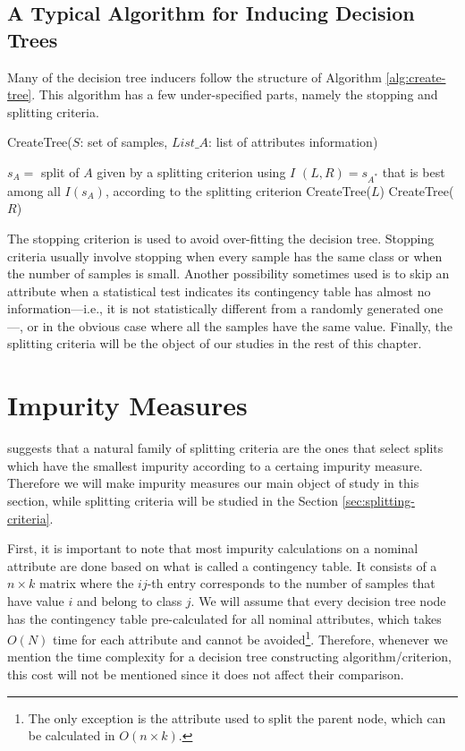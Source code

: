 \subsection{A Typical Algorithm for Inducing Decision Trees}

Many of the decision tree inducers follow the structure of Algorithm \ref{alg:create-tree}. This algorithm has a few under-specified parts, namely the stopping and splitting criteria.

\begin{algorithm}[tb]
   \caption{CreateTree($S$: set of samples, $List\_A$: list of attributes information)}
   \label{alg:create-tree}
\begin{algorithmic}
\STATE $s_A = $ split of $A$ given by a splitting criterion using $I$
\ENDFOR
\STATE $(L, R) = s_{A^*}$  that is best among all $ I(s_A) $, according to the splitting criterion
\STATE CreateTree($L$)
\STATE CreateTree($R$)
\ENDIF
\end{algorithmic}
\end{algorithm}

The stopping criterion is used to avoid over-fitting the decision tree. Stopping criteria usually involve stopping when every sample has the same class or when the number of samples is small. Another possibility sometimes used is to skip an attribute when a statistical test indicates its contingency table has almost no information---i.e., it is not statistically different from a randomly generated one---, or in the obvious case where all the samples have the same value. Finally, the splitting criteria will be the object of our studies in the rest of this chapter.


\section{Impurity Measures}

\cite{Breiman84} suggests that a natural family of splitting criteria are the ones that select splits which have the smallest impurity according to a certaing impurity measure. Therefore we will make impurity measures our main object of study in this section, while splitting criteria will be studied in the Section \ref{sec:splitting-criteria}.

First, it is important to note that most impurity calculations on a nominal attribute are done based on what is called a contingency table. It consists of a $n\times k$ matrix where the $ij$-th entry corresponds to the number of samples that have value $i$ and belong to class $j$. We will assume that every decision tree node has the contingency table pre-calculated for all nominal attributes, which takes $O(N)$ time for each attribute and cannot be avoided\footnote{The only exception is the attribute used to split the parent node, which can be calculated in $O(n\times k)$.}. Therefore, whenever we mention the time complexity for a decision tree constructing algorithm/criterion, this cost will not be mentioned since it does not affect their comparison.

